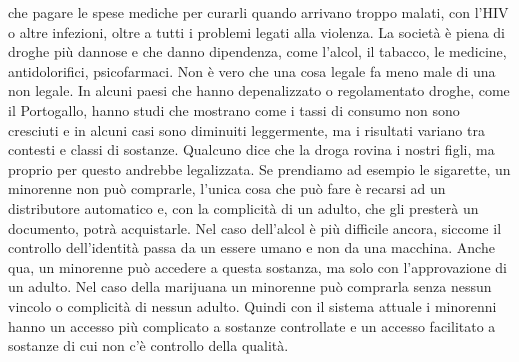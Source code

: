 \documentclass[12pt]{book} %
\begin{document}
\begin{mdframed}[linewidth=1pt]
che pagare le spese mediche per curarli quando arrivano troppo malati, con l'HIV o altre infezioni, oltre a tutti i problemi legati alla violenza. La società è piena di droghe più dannose e che danno dipendenza, come l'alcol, il
tabacco, le medicine, antidolorifici, psicofarmaci. Non è vero che una cosa legale fa meno male di una non legale.
In alcuni paesi che hanno depenalizzato o regolamentato droghe, come il Portogallo, hanno studi che mostrano come i tassi di consumo non sono cresciuti e in alcuni casi sono diminuiti leggermente, ma i risultati variano tra contesti e classi di sostanze. Qualcuno dice che
la droga rovina i nostri figli, ma proprio per questo andrebbe legalizzata. Se prendiamo ad esempio le sigarette, un
minorenne non può comprarle, l'unica cosa che può fare è recarsi ad un distributore automatico e,
con la complicità di un adulto, che gli presterà un documento, potrà acquistarle. Nel caso dell'alcol è più difficile ancora, siccome il controllo dell'identità passa da un essere umano e non da una macchina. Anche qua, un minorenne può accedere a questa sostanza, ma
solo con l'approvazione di un adulto. Nel caso della marijuana un minorenne può comprarla senza
nessun vincolo o complicità di nessun adulto. Quindi con il sistema attuale i minorenni hanno un accesso più complicato
a sostanze controllate e un accesso facilitato a sostanze di cui non c'è controllo della qualità.
\end{mdframed}
\end{document}
